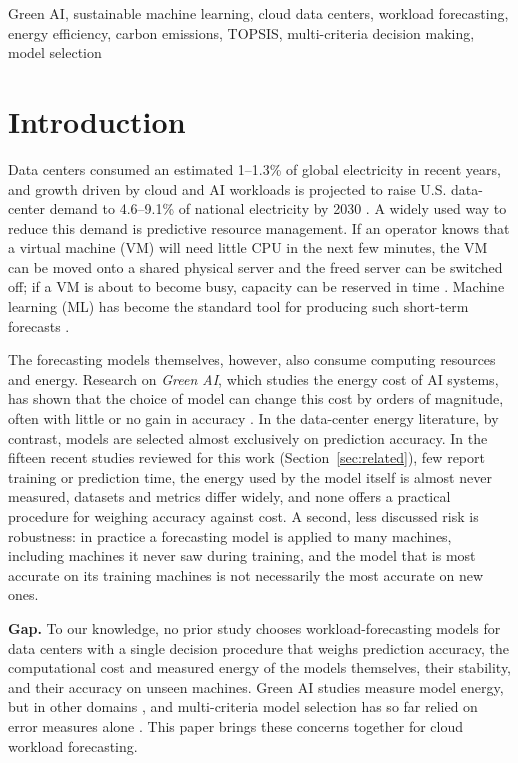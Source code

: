 \documentclass[conference,letterpaper,10pt]{IEEEtran}
\begin{document}
\begin{IEEEkeywords}
Green AI, sustainable machine learning, cloud data centers, workload forecasting, energy efficiency, carbon emissions, TOPSIS, multi-criteria decision making, model selection
\end{IEEEkeywords}

\section{Introduction}
\label{sec:intro}

Data centers consumed an estimated 1--1.3\% of global electricity in recent years, and growth driven by cloud and AI workloads is projected to raise U.S. data-center demand to 4.6--9.1\% of national electricity by 2030 \cite{masanet2020recalibrating,epri2024powering,ifri2025ai}. A widely used way to reduce this demand is predictive resource management. If an operator knows that a virtual machine (VM) will need little CPU in the next few minutes, the VM can be moved onto a shared physical server and the freed server can be switched off; if a VM is about to become busy, capacity can be reserved in time \cite{panwar2024ml,janardhanan2024load}. Machine learning (ML) has become the standard tool for producing such short-term forecasts \cite{kollu2024comparative,mughees2025stlf}.

The forecasting models themselves, however, also consume computing resources and energy. Research on \emph{Green AI}, which studies the energy cost of AI systems, has shown that the choice of model can change this cost by orders of magnitude, often with little or no gain in accuracy \cite{schwartz2020green,strubell2019energy,luccioni2024power,vente2024clicks}. In the data-center energy literature, by contrast, models are selected almost exclusively on prediction accuracy. In the fifteen recent studies reviewed for this work (Section~\ref{sec:related}), few report training or prediction time, the energy used by the model itself is almost never measured, datasets and metrics differ widely, and none offers a practical procedure for weighing accuracy against cost. A second, less discussed risk is robustness: in practice a forecasting model is applied to many machines, including machines it never saw during training, and the model that is most accurate on its training machines is not necessarily the most accurate on new ones.

\textbf{Gap.} To our knowledge, no prior study chooses workload-forecasting models for data centers with a single decision procedure that weighs prediction accuracy, the computational cost and measured energy of the models themselves, their stability, and their accuracy on unseen machines. Green AI studies measure model energy, but in other domains \cite{vente2024clicks,luccioni2024power}, and multi-criteria model selection has so far relied on error measures alone \cite{koubaa2024mcdm}. This paper brings these concerns together for cloud workload forecasting.
\end{document}
